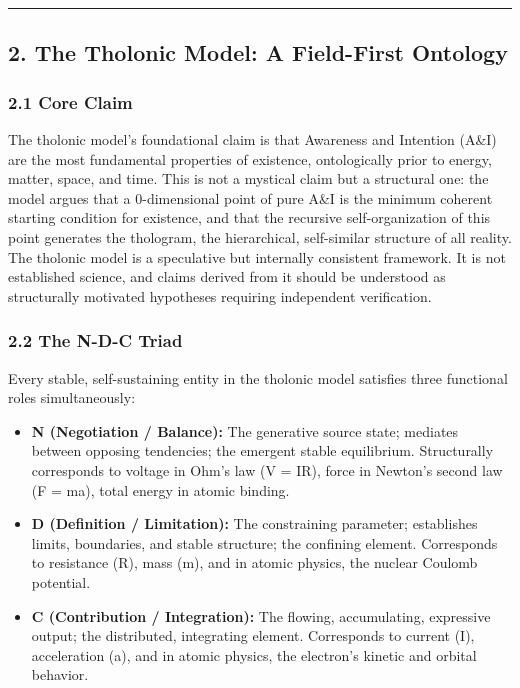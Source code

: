 \documentclass[
  11pt,
  letterpaper,
]{article}
\providecommand{\tightlist}{%
  \setlength{\itemsep}{0pt}\setlength{\parskip}{0pt}}
\begin{document}
\begin{center}\rule{0.5\linewidth}{0.5pt}\end{center}

\subsection{2. The Tholonic Model: A Field-First
Ontology}\label{the-tholonic-model-a-field-first-ontology}

\subsubsection{2.1 Core Claim}\label{core-claim}

The tholonic model's foundational claim is that Awareness and Intention
(A\&I) are the most fundamental properties of existence, ontologically
prior to energy, matter, space, and time. This is not a mystical claim
but a structural one: the model argues that a 0-dimensional point of
pure A\&I is the minimum coherent starting condition for existence, and
that the recursive self-organization of this point generates the
thologram, the hierarchical, self-similar structure of all reality. The
tholonic model is a speculative but internally consistent framework. It
is not established science, and claims derived from it should be
understood as structurally motivated hypotheses requiring independent
verification.

\subsubsection{2.2 The N-D-C Triad}\label{the-n-d-c-triad}

Every stable, self-sustaining entity in the tholonic model satisfies
three functional roles simultaneously:

\begin{itemize}
\tightlist
\item
  \textbf{N (Negotiation / Balance):} The generative source state;
  mediates between opposing tendencies; the emergent stable equilibrium.
  Structurally corresponds to voltage in Ohm's law (V = IR), force in
  Newton's second law (F = ma), total energy in atomic binding.
\item
  \textbf{D (Definition / Limitation):} The constraining parameter;
  establishes limits, boundaries, and stable structure; the confining
  element. Corresponds to resistance (R), mass (m), and in atomic
  physics, the nuclear Coulomb potential.
\item
  \textbf{C (Contribution / Integration):} The flowing, accumulating,
  expressive output; the distributed, integrating element. Corresponds
  to current (I), acceleration (a), and in atomic physics, the
  electron's kinetic and orbital behavior.
\end{itemize}
\end{document}
